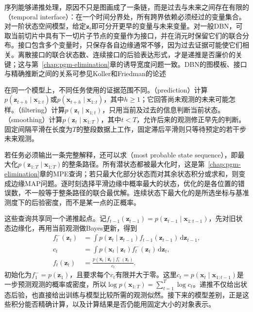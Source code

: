 序列能够递推处理，原因不只是图画成了一条链，而是过去与未来之间存在有限的（temporal interface）：在一个时间分界处，所有跨界依赖必须经过的变量集合。对一阶状态空间模型，给定$\bm{z}_t$即可分开更早的变量与未来变量。对一般DBN，可取当前切片中具有下一切片子节点的变量作为接口，并在消元时保留它们的联合分布。接口包含多个变量时，只保存各自边缘通常不够，因为过去证据可能使它们相关。离散接口的联合状态数、连续接口的后验表达形式，才是递推是否廉价的关键；这与第~\ref{chap:pgm-elimination}章的诱导宽度问题一致。DBN的图模板、接口与精确推断之间的关系可参见Koller和Friedman的论述

在同一个模型上，不同任务使用的证据范围不同。（prediction）计算$p(\bm{z}_{t+h}\mid\bm{x}_{1:t})$或$p(\bm{x}_{t+h}\mid\bm{x}_{1:t})$，其中$h\geq1$；它回答尚未观测的未来可能怎样。（filtering）计算$p(\bm{z}_t\mid\bm{x}_{1:t})$，只用当前及过去的信息判断当前状态。（smoothing）计算$p(\bm{z}_t\mid\bm{x}_{1:T})$，其中$t<T$，允许后来的观测修正早先的判断。固定间隔平滑在长度为$T$的整段数据上工作，固定滞后平滑则只等待预定的若干步未来观测。

若任务必须输出一条完整解释，还可以求（most probable state sequence），即最大化$p(\bm{z}_{1:T}\mid\bm{x}_{1:T})$的整条路径。所有潜状态都被最大化时，这是第~\ref{chap:pgm-elimination}章的MPE查询；若只最大化部分状态而对其余状态积分或求和，则变成边缘MAP问题。逐时刻选择平滑边缘中概率最大的状态，优化的是各位置的错误数，不一般等于整条路径的联合最优解。连续状态下最大化的是所选坐标与基准测度下的后验密度，而不是某一点的正概率。

这些查询共享同一个递推起点。记$f_{t-1}(\bm{z}_{t-1})=p(\bm{z}_{t-1}\mid\bm{x}_{1:t-1})$，先对旧状态边缘化，再用当前观测做Bayes更新，得到
\begin{equation}
  \begin{aligned}
    f_t^{-}(\bm{z}_t)
      &=\int p(\bm{z}_t\mid\bm{z}_{t-1})
        f_{t-1}(\bm{z}_{t-1})\,\mathrm{d}\bm{z}_{t-1},\\
    c_t
      &=\int p(\bm{x}_t\mid\bm{z}_t)
        f_t^{-}(\bm{z}_t)\,\mathrm{d}\bm{z}_t,\\
    f_t(\bm{z}_t)
      &=\frac{p(\bm{x}_t\mid\bm{z}_t)
        f_t^{-}(\bm{z}_t)}{c_t}.
  \end{aligned}
  \label{eq:pgm-dynamic-bayes-filter}
\end{equation}
初始化为$f_1^{-}=p(\bm{z}_1)$，且要求每个$c_t$有限并大于零。这里$c_t=p(\bm{x}_t\mid\bm{x}_{1:t-1})$是一步预测观测的概率或密度，所以$\log p(\bm{x}_{1:T})=\sum_{t=1}^{T}\log c_t$。递推不仅给出状态后验，也直接给出训练与模型比较所需的观测似然。接下来的模型差别，正是这些积分能否精确计算，以及计算结果是否仍能用固定大小的对象表示。

